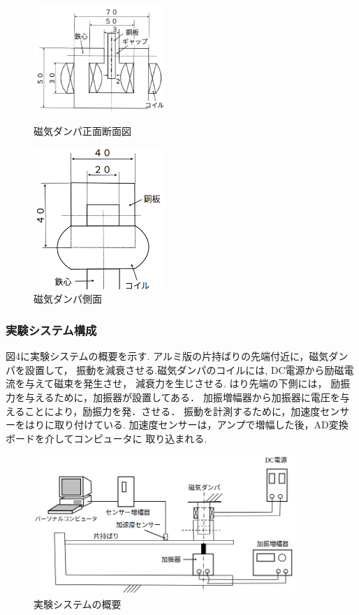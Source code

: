 \documentclass[a4paper,10.5pt]{jsarticle}
\begin{document}
\begin{figure}[h]
  \begin{minipage}{0.5\hsize}
   \begin{center}
    \includegraphics[width=5cm]{2.png}
   \end{center}
   \caption{磁気ダンパ正面断面図}
   \label{fig:one}
  \end{minipage}
  \begin{minipage}{0.5\hsize}
   \begin{center}
    \includegraphics[width=5cm]{3.png}
   \end{center}
   \caption{磁気ダンパ側面}
   \label{fig:two}
  \end{minipage}
\end{figure}  

\subsubsection{実験システム構成}
図4に実験システムの概要を示す. 
アルミ版の片持ばりの先端付近に，磁気ダンパを設置して，
振動を減衰させる.磁気ダンパのコイルには,
DC電源から励磁電流を与えて磁束を発生させ，
減衰力を生じさせる. はり先端の下側には，
励振力を与えるために，加振器が設置してある．
加振増幅器から加振器に電圧を与えることにより，励振力を発．させる．
振動を計測するために，加速度センサーをはりに取り付けている. 
加速度センサーは，アンプで増幅した後，AD変換ボードを介してコンピュータに
取り込まれる.
\newpage

\begin{figure}[h]
  \centering
  \includegraphics[width=10cm]{4.png}
  \caption{実験システムの概要}
\end{figure}
\end{document}
